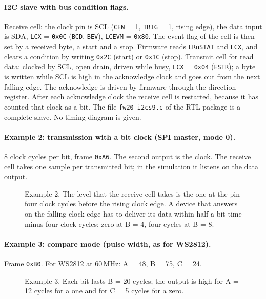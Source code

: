 \documentclass[10pt,a4paper]{article}
\newcommand{\reg}[1]{\texttt{#1}}
\begin{document}
\paragraph{I2C slave with bus condition flags.} Receive cell: the clock pin is SCL (\reg{CEN} = 1, \reg{TRIG} = 1, rising edge), the data
input is SDA, \reg{LCX} = \texttt{0x0C} (\reg{BCD}, \reg{BEV}), \reg{LCEVM} = \texttt{0x80}. The event flag of the cell is then set
by a received byte, a start and a stop. Firmware reads \reg{LRnSTAT} and \reg{LCX}, and clears a condition by
writing \texttt{0x2C} (start) or \texttt{0x1C} (stop). Transmit cell for read data: clocked by SCL, open drain,
driven while busy, \reg{LCX} = \texttt{0x04} (\reg{ESTR}); a byte is written while SCL is high in the acknowledge clock
and goes out from the next falling edge. The acknowledge is driven by firmware through the direction register.
After each acknowledge clock the receive cell is restarted, because it has counted that clock as a bit.
The file \texttt{fw20\_i2cs9.c} of the RTL package is a complete slave. No timing diagram is given.

\paragraph{Example 2: transmission with a bit clock (SPI master, mode 0).} 8 clock cycles per bit, frame
\texttt{0xA6}. The second output is the clock. The receive cell takes one sample per transmitted bit; in the
simulation it listens on the data output.

{\small}

\begin{figure}[H]
\centering

\caption{Example 2. The level that the receive cell takes is the one at the pin four clock cycles before the
rising clock edge. A device that answers on the falling clock edge has to deliver its data within half a bit
time minus four clock cycles: zero at B = 4, four cycles at B = 8.}
\end{figure}

\paragraph{Example 3: compare mode (pulse width, as for WS2812).} Frame \texttt{0xB0}. For WS2812 at 60\,MHz:
A = 48, B = 75, C = 24.

{\small}

\begin{figure}[H]
\centering

\caption{Example 3. Each bit lasts B = 20 cycles; the output is high for A = 12 cycles for a one and for C = 5
cycles for a zero.}
\end{figure}
\end{document}
